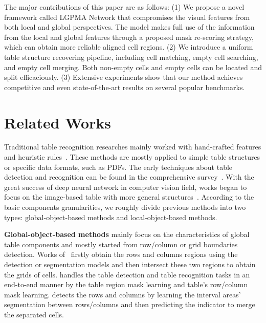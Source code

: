 \documentclass[runningheads]{llncs}
\begin{document}
The major contributions of this paper are as follows:
(1) We propose a novel framework called LGPMA Network that compromises the visual features from both local and global perspectives. The model makes full use of the information from the local and global features through a proposed mask re-scoring strategy, which can obtain more reliable aligned cell regions.
(2) We introduce a uniform table structure recovering pipeline, including cell matching, empty cell searching, and empty cell merging. Both non-empty cells and empty cells can be located and split efficaciously.
(3) Extensive experiments show that our method achieves competitive and even state-of-the-art results on several popular benchmarks.

\section{Related Works}
Traditional table recognition researches mainly worked with hand-crafted features and heuristic rules~\cite{Itonori93,kieninger1998table,WangPH04,liu2008identifying,liu2009improving,DoushP10}. These methods are mostly applied to simple table structures or specific data formats, such as PDFs. The early techniques about table detection and recognition can be found in the comprehensive survey~\cite{ZanibbiBC04}.
With the great success of deep neural network in computer vision field, works began to focus on the image-based table with more general structures~\cite{nishida2017understanding,schreiber2017deepdesrt,qasim2019rethinking,khan2019table,LiCHWZL20,xue2019res2tim,prasad2020cascadetabnet,li2020gfte,tensmeyer2019deep}. According to the basic components granularities, we roughly divide previous methods into two types: global-object-based methods and local-object-based methods.

\textbf{Global-object-based methods} mainly focus on the characteristics of global table components and mostly started from row/column or grid boundaries detection. Works of~\cite{schreiber2017deepdesrt,siddiqui2019deeptabstr,siddiqui2019rethinking} firstly obtain the rows and columns regions using the detection or segmentation models and then intersect these two regions to obtain the grids of cells. \cite{paliwal2019tablenet} handles the table detection and table recognition tasks in an end-to-end manner by the table region mask learning and table's row/column mask learning. \cite{tensmeyer2019deep} detects the rows and columns by learning the interval areas' segmentation between rows/columns and then predicting the indicator to merge the separated cells.
\end{document}
